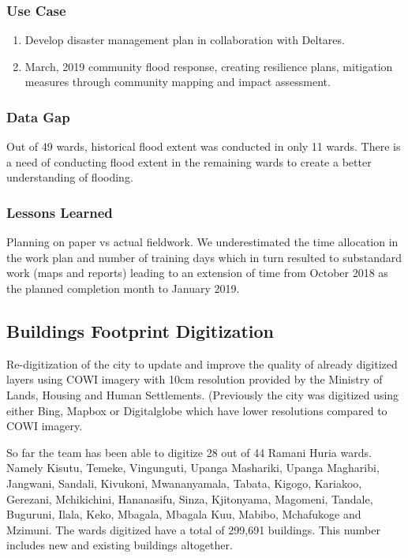 \documentclass[a4paper,12pt,twoside]{article}
\begin{document}
\subsubsection{Use Case}
\begin{enumerate}
    \item Develop disaster management plan in collaboration with Deltares.
    \item March, 2019 community flood response, creating resilience plans, mitigation measures through community mapping and impact assessment.
\end{enumerate}


\subsubsection{Data Gap}
Out of 49 wards, historical flood extent was conducted in only 11 wards. There is a need of conducting flood extent in the remaining wards to create a better understanding of flooding.

\subsubsection{Lessons Learned}
Planning on paper vs actual fieldwork. We underestimated the time allocation in the work plan and number of training days which in turn resulted to substandard work (maps and reports) leading to an extension of time from October 2018 as the planned completion month to January 2019.

\newpage
\subsection{Buildings Footprint Digitization}
\begin{multicols}{2}
Re-digitization of the city to update and improve the quality of already digitized layers using COWI imagery with 10cm resolution provided by the Ministry of Lands, Housing and Human Settlements. (Previously the city was digitized using either Bing, Mapbox or Digitalglobe which have lower resolutions compared to COWI imagery. 

\medskip

So far the team has been able to digitize 28 out of 44 Ramani Huria wards. Namely Kisutu, Temeke, Vingunguti, Upanga Mashariki, Upanga Magharibi, Jangwani, Sandali, Kivukoni, Mwananyamala, Tabata, Kigogo, Kariakoo, Gerezani, Mchikichini, Hananasifu, Sinza, Kjitonyama, Magomeni, Tandale, Buguruni, Ilala, Keko, Mbagala, Mbagala Kuu, Mabibo, Mchafukoge and Mzimuni. The wards digitized have a total of 299,691 buildings. This number includes new and existing buildings altogether.
\end{multicols}
\end{document}
